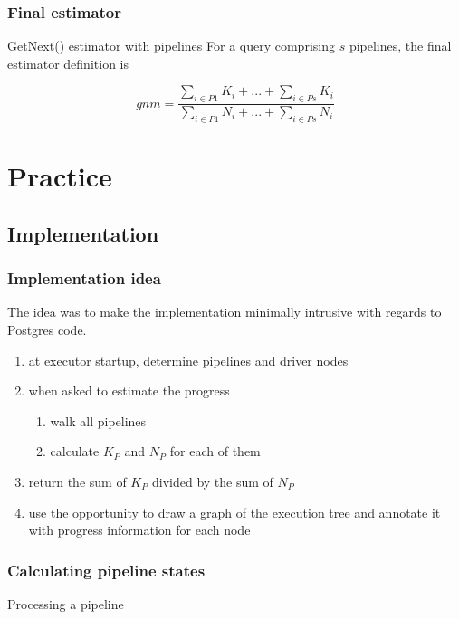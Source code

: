 \documentclass{beamer}
\begin{document}
\begin{frame}
  \frametitle{Final estimator}

  \begin{block}{GetNext() estimator with pipelines}
    For a query comprising $s$ pipelines, the final estimator definition is

    \begin{equation*}
      gnm = \frac{\sum\limits_{i \in P1} K_{i} + ... + \sum\limits_{i \in Ps} K_{i}}
      {\sum\limits_{i \in P1} N_{i} + ... + \sum\limits_{i \in Ps} N_{i}}
    \end{equation*}
  \end{block}
\end{frame}

\section{Practice}
\subsection{Implementation}

\begin{frame}
  \frametitle{Implementation idea}

  The idea was to make the implementation minimally intrusive with regards to
  Postgres code.

  \begin{enumerate}
  \item at executor startup, determine pipelines and driver nodes
  \item when asked to estimate the progress
    \begin{enumerate}
    \item walk all pipelines
    \item calculate $K_{P}$ and $N_{P}$ for each of them
    \end{enumerate}
  \item return the sum of $K_{P}$ divided by the sum of $N_{P}$
  \item use the opportunity to draw a graph of the execution tree and annotate
    it with progress information for each node
  \end{enumerate}
\end{frame}

\begin{frame}[fragile]
  \frametitle{Calculating pipeline states}

\begin{block}{Processing a pipeline}
\begin{semiverbatim}
\end{semiverbatim}
\end{block}
\end{frame}
\end{document}
